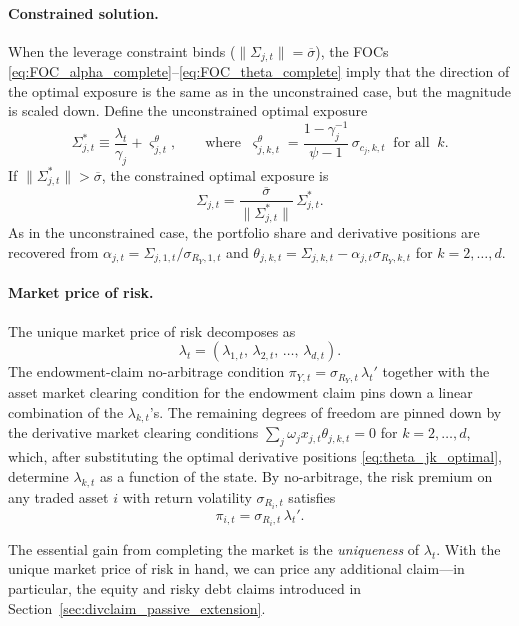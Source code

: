 \documentclass[11pt,english]{article}
\begin{document}
\paragraph{Constrained solution.}
When the leverage constraint binds ($\|\Sigma_{j,t}\|=\overline{\sigma}$), the FOCs \eqref{eq:FOC_alpha_complete}--\eqref{eq:FOC_theta_complete} imply that the direction of the optimal exposure is the same as in the unconstrained case, but the magnitude is scaled down. Define the unconstrained optimal exposure
\[
    \Sigma_{j,t}^{*} \equiv \frac{\lambda_t}{\gamma_j} + \varsigma_{j,t}^{\theta}, \qquad \text{where}\;\; \varsigma_{j,k,t}^{\theta} = \frac{1-\gamma_j^{-1}}{\psi-1}\,\sigma_{c_j,k,t}\;\;\text{for all}\;\;k.
\]
If $\|\Sigma_{j,t}^{*}\|>\overline{\sigma}$, the constrained optimal exposure is
\begin{equation}\label{eq:Sigma_constrained}
    \Sigma_{j,t} = \frac{\overline{\sigma}}{\|\Sigma_{j,t}^{*}\|}\,\Sigma_{j,t}^{*}.
\end{equation}
As in the unconstrained case, the portfolio share and derivative positions are recovered from $\alpha_{j,t}=\Sigma_{j,1,t}/\sigma_{R_Y,1,t}$ and $\theta_{j,k,t}=\Sigma_{j,k,t}-\alpha_{j,t}\sigma_{R_Y,k,t}$ for $k=2,\ldots,d$.

\paragraph{Market price of risk.}
The unique market price of risk decomposes as
\begin{equation}\label{eq:lambda_decomp}
    \lambda_t = (\lambda_{1,t},\,\lambda_{2,t},\,\ldots,\,\lambda_{d,t}).
\end{equation}
The endowment-claim no-arbitrage condition $\pi_{Y,t}=\sigma_{R_Y,t}\,\lambda_t'$ together with the asset market clearing condition for the endowment claim pins down a linear combination of the $\lambda_{k,t}$'s. The remaining degrees of freedom are pinned down by the derivative market clearing conditions $\sum_{j}\omega_j x_{j,t}\theta_{j,k,t}=0$ for $k=2,\ldots,d$, which, after substituting the optimal derivative positions \eqref{eq:theta_jk_optimal}, determine $\lambda_{k,t}$ as a function of the state. By no-arbitrage, the risk premium on any traded asset $i$ with return volatility $\sigma_{R_i,t}$ satisfies
\begin{equation}\label{eq:pi_general}
    \pi_{i,t} = \sigma_{R_i,t}\,\lambda_t'.
\end{equation}

The essential gain from completing the market is the \emph{uniqueness} of $\lambda_t$. With the unique market price of risk in hand, we can price any additional claim---in particular, the equity and risky debt claims introduced in Section~\ref{sec:divclaim_passive_extension}.
\end{document}
